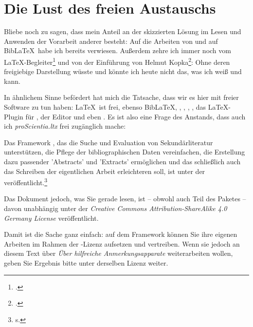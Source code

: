 
\section{Die Lust des freien Austauschs}

Bliebe noch zu sagen, dass mein Anteil an der skizzierten Lösung im Lesen und Anwenden der Vorarbeit anderer besteht: Auf die Arbeiten von  und auf Bib\LaTeX\ habe ich bereits verwiesen. Außerdem zehre ich immer noch vom \LaTeX-Begleiter\footcite[vgl.][S. 741ff]{MitGoo2005a} und von der Einführung von Helmut Kopka\footcite[vgl.][]{Kopka2000a}: Ohne deren freigiebige Darstellung wüsste und könnte ich heute nicht das, was ich weiß und kann.

In ähnlichem Sinne befördert hat mich die Tatsache, dass wir es hier mit freier Software zu tun haben: \LaTeX\ ist frei, ebenso Bib\LaTeX, ,  , , , das \LaTeX-Plugin für , der Editor   und eben . Es ist also eine Frage des Anstands, dass auch ich \textit{proScientia.ltx} frei zugänglich mache:

Das Framework , das die Suche und Evaluation von Sekundärliteratur unterstützen, die Pflege der bibliographischen Daten vereinfachen, die Erstellung dazu passender ’Abstracts’ und ’Extracts’ ermöglichen und das schließlich auch das Schreiben der eigentlichen Arbeit erleichteren soll, ist unter der  veröffentlicht.\footnote{s. }

Das Dokument jedoch, was Sie gerade lesen, ist -- obwohl auch Teil des Paketes -- davon unabhängig unter der \textit{Creative Commons Attribution-ShareAlike 4.0 Germany License} veröffentlicht.

Damit ist die Sache ganz einfach: auf dem Framework  können Sie ihre eigenen Arbeiten im Rahmen der -Lizenz aufsetzen und vertreiben. Wenn sie jedoch an diesem Text über \textit{Über hilfreiche Anmerkungsapparate} weiterarbeiten wollen, geben Sie Ergebnis bitte unter derselben Lizenz weiter.
